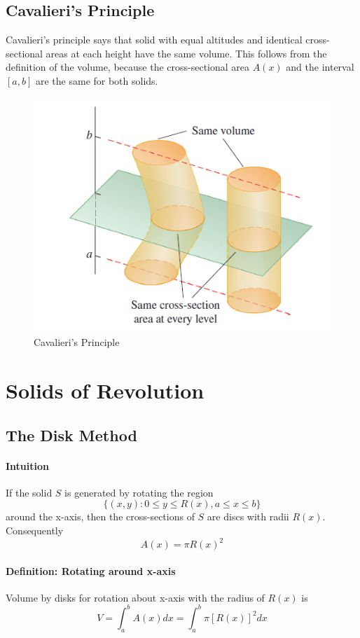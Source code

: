 \documentclass[12pt]{article}
\begin{document}
\subsection{Cavalieri's Principle}
Cavalieri's principle says that solid with equal altitudes and identical cross-sectional areas at each height have the same volume. This follows
from the definition of the volume, because the cross-sectional area $A(x)$ and the interval $[a, b]$ are the same for both solids.
\begin{figure}[H]
    \centering
    \includegraphics[width = 0.3\linewidth]{Images/cavalieri's principle.png}
    \caption{Cavalieri's Principle}
\end{figure}
\section{Solids of Revolution}
\subsection{The Disk Method}
\paragraph{Intuition}
If the solid $S$ is generated by rotating the region
\[
    \{(x, y): 0 \leq y \leq R(x), a \leq x \leq b\}
\]
around the x-axis, then the cross-sections of $S$ are discs with radii $R(x)$. Consequently 
\[
    A(x) = \pi R(x)^2
\]

\paragraph{Definition: Rotating around x-axis}
Volume by disks for rotation about x-axis with the radius of $R(x)$ is
\[
    V = \int_a^b A(x) dx = \int_a^b \pi [R(x)]^2 dx
\]
\end{document}
